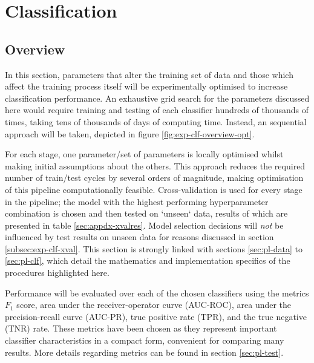 \section{Classification}
\label{sec:exp-clf}
    \subsection{Overview}
    \label{subsec:exp-clf-overview}
        In this section, parameters that alter the training set of data and those which affect the training process itself will be experimentally optimised to increase classification performance. An exhaustive grid search for the parameters discussed here would require training and testing of each classifier hundreds of thousands of times, taking tens of thousands of days of computing time. Instead, an sequential approach will be taken, depicted in figure \ref{fig:exp-clf-overview-opt}. 
        
        For each stage, one parameter/set of parameters is locally optimised whilst making initial assumptions about the others. 
        This approach reduces the required number of train/test cycles by several orders of magnitude, making optimisation of this pipeline computationally feasible. Cross-validation is used for every stage in the pipeline; the model with the highest performing hyperparameter combination is chosen and then tested on `unseen` data, results of which are presented in table \ref{sec:appdx-xvalres}. Model selection decisions will \textit{not} be influenced by test results on unseen data for reasons discussed in section \ref{subsec:exp-clf-xval}. This section is strongly linked with sections \ref{sec:pl-data} to \ref{sec:pl-clf}, which detail the mathematics and implementation specifics of the procedures highlighted here.
        
        Performance will be evaluated over each of the chosen classifiers using the metrics $F_{1}$ score, area under the receiver-operator curve (AUC-ROC), area under the precision-recall curve (AUC-PR), true positive rate (TPR), and the true negative (TNR) rate. These metrics have been chosen as they represent important classifier characteristics in a compact form, convenient for comparing many results. More details regarding metrics can be found in section \ref{sec:pl-test}. 

